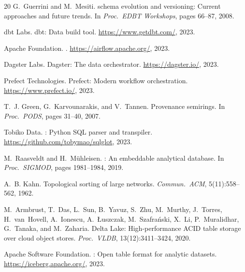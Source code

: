 \documentclass[sigplan,screen,nonacm]{acmart}
\begin{document}
\begin{thebibliography}{20}
G.~Guerrini and M.~Mesiti.
 schema evolution and versioning: Current approaches and future
  trends.
\newblock In \emph{Proc.\ EDBT Workshops}, pages 66--87, 2008.

{dbt Labs}.
\newblock dbt: Data build tool.
\newblock \url{https://www.getdbt.com/}, 2023.

{Apache Foundation}.
.
\newblock \url{https://airflow.apache.org/}, 2023.

{Dagster Labs}.
\newblock Dagster: The data orchestrator.
\newblock \url{https://dagster.io/}, 2023.

{Prefect Technologies}.
\newblock Prefect: Modern workflow orchestration.
\newblock \url{https://www.prefect.io/}, 2023.

T.~J. Green, G.~Karvounarakis, and V.~Tannen.
\newblock Provenance semirings.
\newblock In \emph{Proc.\ PODS}, pages 31--40, 2007.

{Tobiko Data}.
: Python {SQL} parser and transpiler.
\newblock \url{https://github.com/tobymao/sqlglot}, 2023.

M.~Raasveldt and H.~M\"uhleisen.
: An embeddable analytical database.
\newblock In \emph{Proc.\ SIGMOD}, pages 1981--1984, 2019.

A.~B. Kahn.
\newblock Topological sorting of large networks.
\newblock \emph{Commun.\ ACM}, 5(11):558--562, 1962.

M.~Armbrust, T.~Das, L.~Sun, B.~Yavuz, S.~Zhu, M.~Murthy, J.~Torres,
  H.~van~Hovell, A.~Ionescu, A.~\L{}uszczak, M.~Szafra\'nski, X.~Li,
  P.~Muralidhar, G.~Tanaka, and M.~Zaharia.
\newblock Delta {Lake}: High-performance {ACID} table storage over cloud object
  stores.
\newblock \emph{Proc.\ VLDB}, 13(12):3411--3424, 2020.

{Apache Software Foundation}.
: Open table format for analytic datasets.
\newblock \url{https://iceberg.apache.org/}, 2023.

\end{thebibliography}
\end{document}
